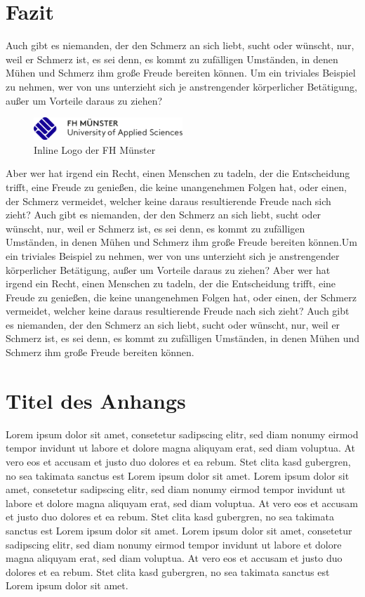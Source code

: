 \documentclass[12pt]{report}
\begin{document}
\chapter{Fazit}
Auch gibt es niemanden, der den Schmerz an sich liebt, sucht oder wünscht, nur, weil er Schmerz ist,
es sei denn, es kommt zu zufälligen Umständen, in denen Mühen und Schmerz ihm große Freude bereiten
können. Um ein triviales Beispiel zu nehmen, wer von uns unterzieht sich je anstrengender körperlicher
Betätigung, außer um Vorteile daraus zu ziehen?
\begin{figure}
    \includegraphics[width=0.5\textwidth]{fh_logo}
    \caption{Inline Logo der FH Münster}
\end{figure}
Aber wer hat irgend ein Recht, einen Menschen zu
tadeln, der die Entscheidung trifft, eine Freude zu genießen, die keine unangenehmen Folgen hat,
oder einen, der Schmerz vermeidet, welcher keine daraus resultierende Freude nach sich zieht?
Auch gibt es niemanden, der den Schmerz an sich liebt, sucht oder wünscht, nur, weil er Schmerz ist,
es sei denn, es kommt zu zufälligen Umständen, in denen Mühen und Schmerz ihm große Freude bereiten
können.\cite[S.~150]{Wolff.2018}Um ein triviales Beispiel zu nehmen, wer von uns unterzieht sich je anstrengender körperlicher
Betätigung, außer um Vorteile daraus zu ziehen? Aber wer hat irgend ein Recht, einen Menschen zu
tadeln, der die Entscheidung trifft, eine Freude zu genießen, die keine unangenehmen Folgen hat,
oder einen, der Schmerz vermeidet, welcher keine daraus resultierende Freude nach sich zieht? Auch
gibt es niemanden, der den Schmerz an sich liebt, sucht oder wünscht, nur, weil er Schmerz ist, es
sei denn, es kommt zu zufälligen Umständen, in denen Mühen und Schmerz ihm große Freude bereiten
können.



\appendix
\chapter{Titel des Anhangs}
Lorem ipsum dolor sit amet, consetetur sadipscing elitr, sed diam nonumy eirmod tempor invidunt ut labore et dolore magna aliquyam erat, sed diam voluptua. At vero eos et accusam et justo duo dolores et ea rebum. Stet clita kasd gubergren, no sea takimata sanctus est Lorem ipsum dolor sit amet. Lorem ipsum dolor sit amet, consetetur sadipscing elitr, sed diam nonumy eirmod tempor invidunt ut labore et dolore magna aliquyam erat, sed diam voluptua. At vero eos et accusam et justo duo dolores et ea rebum. Stet clita kasd gubergren, no sea takimata sanctus est Lorem ipsum dolor sit amet. Lorem ipsum dolor sit amet, consetetur sadipscing elitr, sed diam nonumy eirmod tempor invidunt ut labore et dolore magna aliquyam erat, sed diam voluptua. At vero eos et accusam et justo duo dolores et ea rebum. Stet clita kasd gubergren, no sea takimata sanctus est Lorem ipsum dolor sit amet.   
\end{document}
